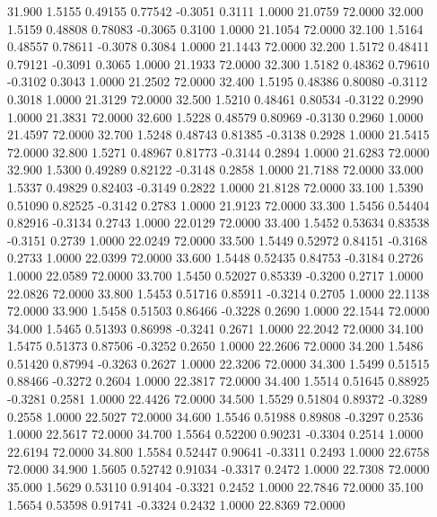   31.900   1.5155   0.49155   0.77542  -0.3051   0.3111   1.0000  21.0759  72.0000
  32.000   1.5159   0.48808   0.78083  -0.3065   0.3100   1.0000  21.1054  72.0000
  32.100   1.5164   0.48557   0.78611  -0.3078   0.3084   1.0000  21.1443  72.0000
  32.200   1.5172   0.48411   0.79121  -0.3091   0.3065   1.0000  21.1933  72.0000
  32.300   1.5182   0.48362   0.79610  -0.3102   0.3043   1.0000  21.2502  72.0000
  32.400   1.5195   0.48386   0.80080  -0.3112   0.3018   1.0000  21.3129  72.0000
  32.500   1.5210   0.48461   0.80534  -0.3122   0.2990   1.0000  21.3831  72.0000
  32.600   1.5228   0.48579   0.80969  -0.3130   0.2960   1.0000  21.4597  72.0000
  32.700   1.5248   0.48743   0.81385  -0.3138   0.2928   1.0000  21.5415  72.0000
  32.800   1.5271   0.48967   0.81773  -0.3144   0.2894   1.0000  21.6283  72.0000
  32.900   1.5300   0.49289   0.82122  -0.3148   0.2858   1.0000  21.7188  72.0000
  33.000   1.5337   0.49829   0.82403  -0.3149   0.2822   1.0000  21.8128  72.0000
  33.100   1.5390   0.51090   0.82525  -0.3142   0.2783   1.0000  21.9123  72.0000
  33.300   1.5456   0.54404   0.82916  -0.3134   0.2743   1.0000  22.0129  72.0000
  33.400   1.5452   0.53634   0.83538  -0.3151   0.2739   1.0000  22.0249  72.0000
  33.500   1.5449   0.52972   0.84151  -0.3168   0.2733   1.0000  22.0399  72.0000
  33.600   1.5448   0.52435   0.84753  -0.3184   0.2726   1.0000  22.0589  72.0000
  33.700   1.5450   0.52027   0.85339  -0.3200   0.2717   1.0000  22.0826  72.0000
  33.800   1.5453   0.51716   0.85911  -0.3214   0.2705   1.0000  22.1138  72.0000
  33.900   1.5458   0.51503   0.86466  -0.3228   0.2690   1.0000  22.1544  72.0000
  34.000   1.5465   0.51393   0.86998  -0.3241   0.2671   1.0000  22.2042  72.0000
  34.100   1.5475   0.51373   0.87506  -0.3252   0.2650   1.0000  22.2606  72.0000
  34.200   1.5486   0.51420   0.87994  -0.3263   0.2627   1.0000  22.3206  72.0000
  34.300   1.5499   0.51515   0.88466  -0.3272   0.2604   1.0000  22.3817  72.0000
  34.400   1.5514   0.51645   0.88925  -0.3281   0.2581   1.0000  22.4426  72.0000
  34.500   1.5529   0.51804   0.89372  -0.3289   0.2558   1.0000  22.5027  72.0000
  34.600   1.5546   0.51988   0.89808  -0.3297   0.2536   1.0000  22.5617  72.0000
  34.700   1.5564   0.52200   0.90231  -0.3304   0.2514   1.0000  22.6194  72.0000
  34.800   1.5584   0.52447   0.90641  -0.3311   0.2493   1.0000  22.6758  72.0000
  34.900   1.5605   0.52742   0.91034  -0.3317   0.2472   1.0000  22.7308  72.0000
  35.000   1.5629   0.53110   0.91404  -0.3321   0.2452   1.0000  22.7846  72.0000
  35.100   1.5654   0.53598   0.91741  -0.3324   0.2432   1.0000  22.8369  72.0000
